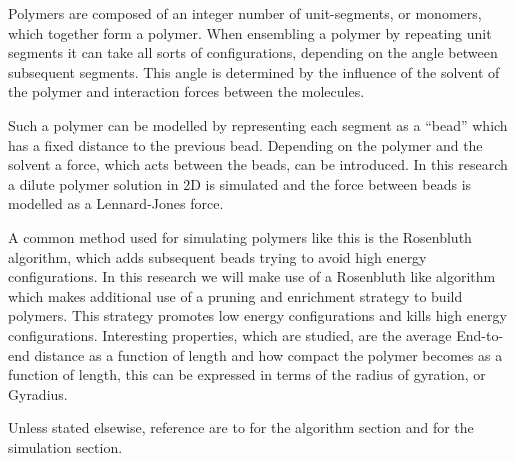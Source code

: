 Polymers are composed of an integer number of unit-segments, or monomers, which together form a polymer. When ensembling a polymer by repeating unit segments it can take all sorts of configurations, depending on the angle between subsequent segments. This angle is determined by the influence of the solvent of the polymer and interaction forces between the molecules. 

Such a polymer can be modelled by representing each segment as a ``bead'' which has a fixed distance to the previous bead. Depending on the polymer and the solvent a force, which acts between the beads, can be introduced. In this research a dilute polymer solution in 2D is simulated and the force between beads is modelled as a Lennard-Jones force.

A common method used for simulating polymers like this is the Rosenbluth algorithm, which adds subsequent beads trying to avoid high energy configurations. In this research we will make use of a Rosenbluth like algorithm which makes additional use of a pruning and enrichment strategy to build polymers. This strategy promotes low energy configurations and kills high energy configurations. 
Interesting properties, which are studied, are the average End-to-end distance as a function of length and how compact the polymer becomes as a function of length, this can be expressed in terms of the radius of gyration, or Gyradius.

Unless stated elsewise, reference are to \cite{baschnagel2004} for the algorithm section and \cite{thijssen2007} for the simulation section.